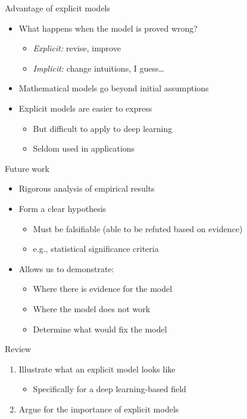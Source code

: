 \documentclass{beamer}
\begin{document}
\begin{frame}{Advantage of explicit models}
    \begin{itemize}
        \item What happens when the model is proved wrong?
            \begin{itemize}
                \item \textit{Explicit:} revise, improve
                \item \textit{Implicit:} change intuitions, I guess\ldots
            \end{itemize}
        \item Mathematical models go beyond initial assumptions
        \item Explicit models are easier to express
            \begin{itemize}
                \item But difficult to apply to deep learning
                \item Seldom used in applications
            \end{itemize}
    \end{itemize}
\end{frame}

\begin{frame}{Future work}
    \begin{itemize}
        \item Rigorous analysis of empirical results
        \item Form a clear hypothesis
            \begin{itemize}
                \item Must be falsifiable (able to be refuted based on evidence)
                \item e.g., statistical significance criteria
            \end{itemize}
        \item Allows us to demonstrate:
            \begin{itemize}
                \item Where there is evidence for the model
                \item Where the model does not work
                \item Determine what would fix the model
            \end{itemize}
    \end{itemize}
\end{frame}

\begin{frame}{Review}
    \begin{enumerate}
        \item Illustrate what an explicit model looks like
            \begin{itemize}
                \item Specifically for a deep learning-based field
            \end{itemize}
        \item Argue for the importance of explicit models
    \end{enumerate}
\end{frame}
\end{document}
